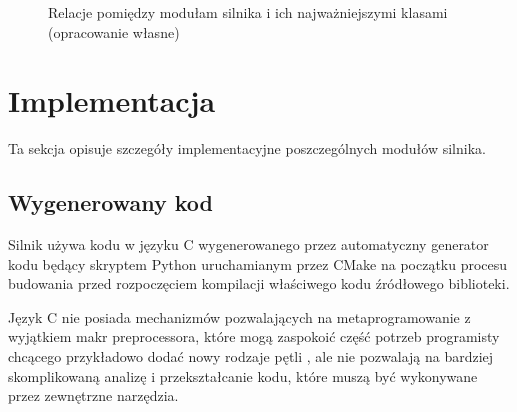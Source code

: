 \begin{figure}[H]
	\caption{Relacje pomiędzy modułam silnika i ich najważniejszymi klasami (opracowanie własne)}
	\label{archit}
\end{figure}

\section {Implementacja}

Ta sekcja opisuje szczegóły implementacyjne poszczególnych modułów silnika.

\subsection{Wygenerowany kod}

Silnik używa kodu w języku C wygenerowanego przez automatyczny generator kodu będący skryptem Python uruchamianym przez CMake na początku procesu budowania przed rozpoczęciem kompilacji właściwego
kodu źródłowego biblioteki.

Język C nie posiada mechanizmów pozwalających na metaprogramowanie z wyjątkiem makr preprocessora, które mogą zaspokoić część potrzeb programisty chcącego przykładowo dodać nowy rodzaje pętli \cite{METACONTROLC}, ale nie pozwalają na bardziej skomplikowaną analizę i przekształcanie kodu, które muszą być wykonywane przez zewnętrzne narzędzia.

